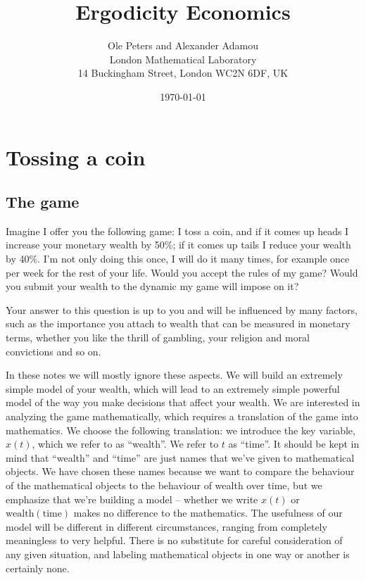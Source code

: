 \documentclass[a4paper]{article}
\newcommand{\seclabel}[1]{\label{section:#1}}
\begin{document}
\title{Ergodicity Economics}
\author{Ole Peters and Alexander Adamou\\
London Mathematical Laboratory\\
14 Buckingham Street, London WC2N 6DF, UK}
\date{\today}
\maketitle
\begin{abstract}

\end{abstract}

\tableofcontents
\newpage

\section{Tossing a coin}
\subsection{The game}
\seclabel{The_game}
Imagine I offer you the following game: I toss a coin, and if it comes 
up heads I increase your monetary wealth by 50\%; if 
it comes up tails I reduce your wealth by 40\%. I'm not only 
doing this once, I will do it many times, for example 
once per week for the rest of your life. Would you accept 
the rules of my game? Would you submit your wealth to 
the dynamic my game will impose on it?

Your answer to this question is up to you and will be 
influenced by many factors, such as the importance 
you attach to wealth that can be measured in monetary 
terms, whether you like the thrill of gambling, your 
religion and moral convictions and so on.

In these notes we will mostly ignore these aspects.
We will build an extremely simple model of your 
wealth, which will lead to an extremely simple
powerful model of the way you make decisions that affect 
your wealth. We are interested in analyzing the 
game mathematically, which requires a translation 
of the game into mathematics. We choose the 
following translation: we introduce the key 
variable, $x(t)$, which we refer to as ``wealth''. 
We refer to $t$ as ``time''. It should be kept in mind that
``wealth'' and ``time'' are just names that we've given to 
mathematical objects. We have chosen these names because
we want to compare the behaviour of the mathematical
objects to the behaviour of wealth over time, but
we emphasize that we're building a model -- whether we write $x(t)$ 
or $\text{wealth}(\text{time})$ makes no difference to the mathematics. 
The usefulness of our model will be different in different circumstances, 
ranging from completely meaningless to very helpful. There is no 
substitute for careful consideration of any given situation, and
labeling mathematical objects in one way or another is certainly none.
\end{document}
